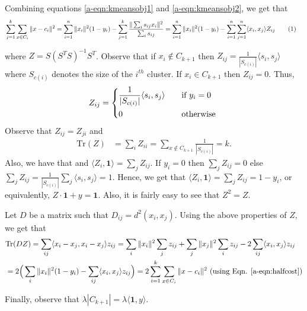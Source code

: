 \documentclass[12pt]{article}
\newcommand{\mb}{\mathbf}
\newcommand{\tr}{\text{Tr}}
\newcommand\numberthis{\addtocounter{equation}{1}\tag{\theequation}}
\begin{document}
\noindent Combining equations \ref{a-eqn:kmeansobj1} and \ref{a-eqn:kmeansobj2}, we get that 
\begin{align*}
  &\sum_{j=1}^k \sum_{x \in C_i} \|x-c_i\|^2 = \sum_{i=1}^n \|x_i\|^2 (1-y_i) - \sum_{j=1}^k \frac{\| \sum_i s_{ij} x_i\|^2}{\sum_i s_{ij}} = \sum_{i=1}^n \|x_i\|^2 (1-y_i) - \sum_{i=1}^n\sum_{j=1}^n \langle x_i, x_j\rangle Z_{ij} \label{a-eqn:halfcost}\numberthis
\end{align*}

where $Z = S (S^T S)^{-1} S^T$. Observe that if $x_i \not\in C_{k+1}$ then $Z_{ij} = \frac{1}{|S_{c(i)}|} \langle s_i, s_j\rangle$ where $S_{c(i)}$ denotes the size of the $i^{th}$ cluster. If $x_i \in C_{k+1}$ then $Z_{ij}=0$. Thus, 
\[
	Z_{ij} = 
	\begin{dcases}
	\frac{1}{|S_{c(i)}|} \langle s_i, s_j\rangle \quad &\text{if }y_i = 0\\
	0 \quad &\text{otherwise }
	\end{dcases}
\]
Observe that $Z_{ij} = Z_{ji}$ and
\begin{align*}
\tr(Z) &= \sum_i Z_{ii} = \sum_{x \not\in C_{k+1}} \frac{1}{|S_{c(i)}|} = k. 
\end{align*}
Also, we have that  and $\langle Z_i, \mb 1\rangle = \sum_{j} Z_{ij}$. If $y_i = 0$ then $\sum_{j}Z_{ij} = 0$ else $\sum_j Z_{ij} = \frac{1}{|S_{c(i)}|}\sum_j \langle s_i, s_j\rangle = 1$. Hence, we get that $\langle Z_i, \mb 1\rangle = \sum_j Z_{ij} = 1-y_i$, or equivalently, $Z\cdot \mb 1 + y = \mb 1$. Also, it is fairly easy to see that $Z^2 = Z$.

Let $D$ be a matrix such that $D_{ij} = d^2(x_i, x_j)$. Using the above properties of $Z$, we get that
\begin{align*}
&\tr(DZ) = \sum_{ij} \langle x_i - x_j, x_i-x_j\rangle z_{ij} = \sum_i\|x_i\|^2\sum_j z_{ij} + \sum_j\|x_j\|^2\sum_i z_{ij} -2\sum_{ij}\langle x_i, x_j\rangle z_{ij} \\
&= 2\Big( \sum_i\|x_i\|^2 (1-y_i) - \sum_{ij}\langle x_i, x_j\rangle z_{ij}\Big) = 2 \sum_{i=1}^k \sum_{x \in C_i} \|x-c_i\|^2 \text{ (using Eqn. \ref{a-eqn:halfcost})}
\end{align*}

Finally, observe that $\lambda |C_{k+1}| = \lambda\langle \mb 1, y\rangle$.
\end{document}
